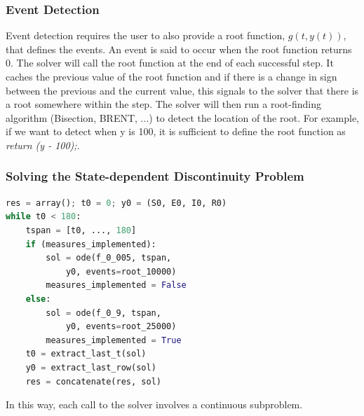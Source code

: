 \documentclass{beamer}
\begin{document}
\begin{frame}
\frametitle{Event Detection}
Event detection requires the user to also provide a root function, $g(t, y(t))$, that defines the events. An event is said to occur when the root function returns 0.
\newline \newline
The solver will call the root function at the end of each successful step.
It caches the previous value of the root function and if there is a change in sign between the previous and the current value, this signals to the solver that there is a root somewhere within the step.
\newline \newline
The solver will then run a root-finding algorithm (Bisection, BRENT, ...) to detect the location of the root.
\newline \newline
For example, if we want to detect when y is 100, it is sufficient to define the root function as \emph{return (y - 100);}. 
\end{frame}

\begin{frame}[fragile]
\frametitle{Solving the State-dependent Discontinuity Problem}
\begin{lstlisting}[language=Python]
res = array(); t0 = 0; y0 = (S0, E0, I0, R0)
while t0 < 180:
    tspan = [t0, ..., 180]
    if (measures_implemented):
        sol = ode(f_0_005, tspan, 
            y0, events=root_10000)
        measures_implemented = False
    else:
        sol = ode(f_0_9, tspan, 
            y0, events=root_25000)
        measures_implemented = True
    t0 = extract_last_t(sol)
    y0 = extract_last_row(sol)
    res = concatenate(res, sol)
\end{lstlisting}
In this way, each call to the solver involves a continuous subproblem.
\end{frame}
\end{document}
